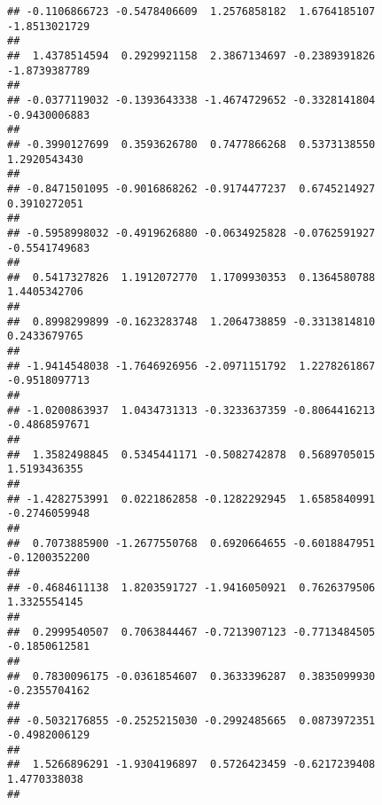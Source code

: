 \documentclass[]{article}
\begin{document}
\begin{verbatim}
## -0.1106866723 -0.5478406609  1.2576858182  1.6764185107 -1.8513021729 
##                                                                       
##  1.4378514594  0.2929921158  2.3867134697 -0.2389391826 -1.8739387789 
##                                                                       
## -0.0377119032 -0.1393643338 -1.4674729652 -0.3328141804 -0.9430006883 
##                                                                       
## -0.3990127699  0.3593626780  0.7477866268  0.5373138550  1.2920543430 
##                                                                       
## -0.8471501095 -0.9016868262 -0.9174477237  0.6745214927  0.3910272051 
##                                                                       
## -0.5958998032 -0.4919626880 -0.0634925828 -0.0762591927 -0.5541749683 
##                                                                       
##  0.5417327826  1.1912072770  1.1709930353  0.1364580788  1.4405342706 
##                                                                       
##  0.8998299899 -0.1623283748  1.2064738859 -0.3313814810  0.2433679765 
##                                                                       
## -1.9414548038 -1.7646926956 -2.0971151792  1.2278261867 -0.9518097713 
##                                                                       
## -1.0200863937  1.0434731313 -0.3233637359 -0.8064416213 -0.4868597671 
##                                                                       
##  1.3582498845  0.5345441171 -0.5082742878  0.5689705015  1.5193436355 
##                                                                       
## -1.4282753991  0.0221862858 -0.1282292945  1.6585840991 -0.2746059948 
##                                                                       
##  0.7073885900 -1.2677550768  0.6920664655 -0.6018847951 -0.1200352200 
##                                                                       
## -0.4684611138  1.8203591727 -1.9416050921  0.7626379506  1.3325554145 
##                                                                       
##  0.2999540507  0.7063844467 -0.7213907123 -0.7713484505 -0.1850612581 
##                                                                       
##  0.7830096175 -0.0361854607  0.3633396287  0.3835099930 -0.2355704162 
##                                                                       
## -0.5032176855 -0.2525215030 -0.2992485665  0.0873972351 -0.4982006129 
##                                                                       
##  1.5266896291 -1.9304196897  0.5726423459 -0.6217239408  1.4770338038 
##                                                                       

\end{verbatim}
\end{document}
